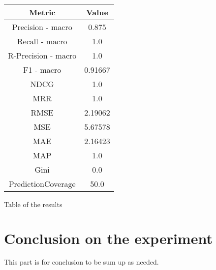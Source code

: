 \documentclass[11pt]{article}
\begin{document}
\begin{center}
    \begin{tabular}{|c|c|}
        \hline
        \textbf{Metric} & \textbf{Value} \\ \hline
        Precision - macro & 0.875\\ \hline
                Recall - macro & 1.0\\ \hline
                R-Precision - macro & 1.0\\ \hline
                F1 - macro &  0.91667\\ \hline
                NDCG  & 1.0\\ \hline
            MRR  & 1.0\\ \hline
            RMSE & 2.19062\\ \hline
            MSE & 5.67578\\ \hline
            MAE & 2.16423\\ \hline
            MAP  & 1.0\\ \hline
            Gini & 0.0\\ \hline
            PredictionCoverage & 50.0\\ \hline
         \end{tabular}
    \captionsetup{type=table}
    \caption{Table of the results}
    \label{tab:results_table_sys - mean}
\end{center}
\hfill\break
\hfill\break






\section{Conclusion on the experiment}\label{sec:conclution}
This part is for conclusion to be sum up as needed.
\hfill\break
\hfill\break

\end{document}

